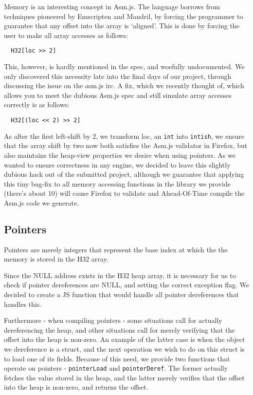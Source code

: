 \documentclass[twoside]{article}
\begin{document}
\begin{multicols}{2}
    Memory is an interesting concept in Asm.js. The language borrows from techniques pioneered by 
    Emscripten and Mandril, by forcing the programmer to guarantee that any offset into the array
    is `aligned'. This is done by forcing the user to make all array accesses as follows:
\begin{verbatim}
  H32[loc >> 2]
\end{verbatim}
    This, however, is hardly mentioned in the spec, and woefully undocumented. We only discovered
    this necessity late into the final days of our project, through discussing the issue on the
    asm.js irc. A fix, which we recently thought of, which allows you to meet the dubious Asm.js 
    spec and still simulate array accesses correctly is as follows: 
\begin{verbatim}
  H32[(loc << 2) >> 2]
\end{verbatim}
    As after the first left-shift by 2, we transform loc, an \texttt{int} into \texttt{intish}, 
    we ensure that the array shift by two now both satisfies the Asm.js validator in Firefox,
    but also maintains the heap-view properties we desire when using pointers. As we wanted
    to ensure correctness in any engine, we decided to leave this slightly dubious hack out
    of the submitted project, although we guarantee that applying this tiny bug-fix to all
    memory accessing functions in the library we provide (there's about 10) will cause Firefox
    to validate and Ahead-Of-Time compile the Asm.js code we generate. 

  \subsection{Pointers}
    Pointers are merely integers that represent the base index at which the
    the memory is stored in the H32 array.

    Since the NULL address exists in the H32 heap array, it is necessary for
    us to check if pointer dereferences are NULL, and setting the correct
    exception flag. We decided to create a JS function that would handle all
    pointer dereferences that handles this. 

    Furthermore - when compiling pointers - some situations call for actually
    dereferencing the heap, and other situations call for merely verifying that 
    the offset into the heap is non-zero. An example of the latter case is when
    the object we dereference is a struct, and the next operation we wish to do
    on this struct is to load one of its fields. Because of this need, we provide
    two functions that operate on pointers - \texttt{pointerLoad} and \texttt{pointerDeref}. 
    The former actually fetches the value stored in the heap, and the latter
    merely verifies that the offset into the heap is non-zero, and returns the offset. 


\end{multicols}
\end{document}
